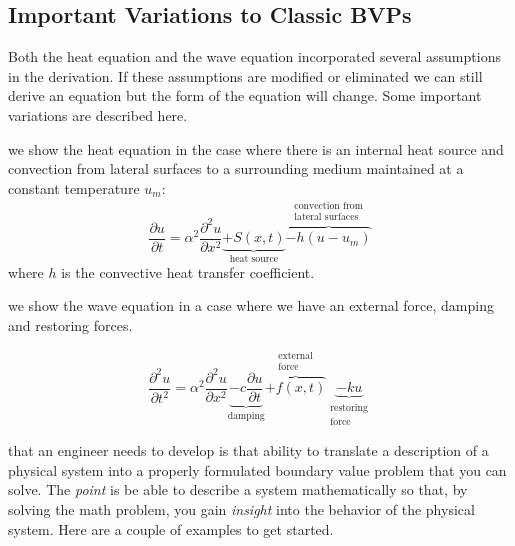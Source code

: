 \subsection{Important Variations to Classic BVPs}
Both the heat equation and the wave equation incorporated several assumptions in the derivation.  If these assumptions are modified or eliminated we can still derive an equation but the form of the equation will change.  Some important variations are described here.

 we show the heat equation in the case where there is an internal heat source and convection from lateral surfaces to a surrounding medium maintained at a constant temperature $u_m$:
\begin{equation}
\frac{\partial u}{\partial t} = \alpha^2 \frac{\partial^2 u}{\partial x^2} \underbrace{+ S(x,t)}_{\text{heat source}} \overbrace{- h(u-u_m)}^{\substack{\text{convection from} \\ \text{lateral surfaces}}}
\label{eq:heat-eq-with-variations}
\end{equation}
where $h$ is the convective heat transfer coefficient.

 we show the wave equation in a case where we have an external force, damping and restoring forces.

\begin{equation}
\frac{\partial^2 u}{\partial t^2} = \alpha^2 \frac{\partial^2 u}{\partial x^2} \underbrace{-c\frac{\partial u}{\partial t}}_{\text{damping}}\overbrace{+f(x,t)}^{\substack{\text{external}\\\text{force}}}\underbrace{-ku}_{\substack{\text{restoring}\\ \text{force}}}
\label{eq:wave-eq-with-variations}
\end{equation}

\vspace{2.0cm}

 that an engineer needs to develop is that ability to translate a description of a physical system into a properly formulated boundary value problem that you can solve.  The \emph{point} is be able to describe a system mathematically so that, by solving the math problem, you gain \emph{insight} into the behavior of the physical system.  Here are a couple of examples to get started.

